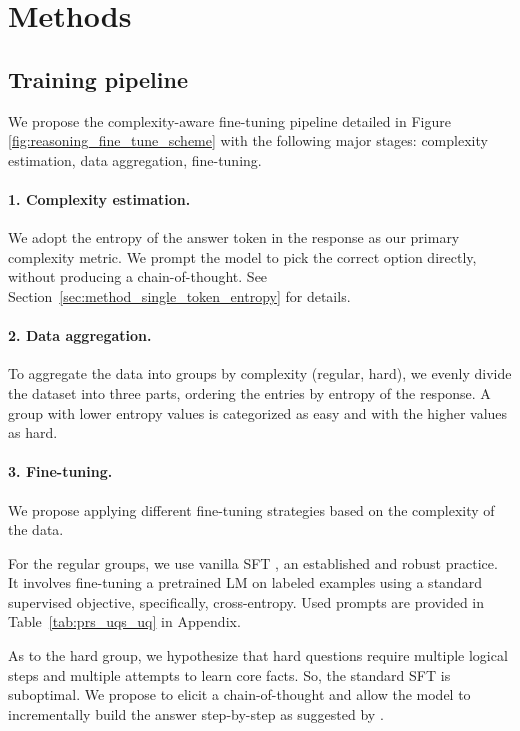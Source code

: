 \section{Methods}

\subsection{Training pipeline}
\label{sec:pipeline}

We propose the complexity-aware fine-tuning pipeline detailed in Figure \ref{fig:reasoning_fine_tune_scheme} with the following major stages: complexity estimation, data aggregation, fine-tuning.

\paragraph{1. Complexity estimation.}
We adopt the entropy of the answer token in the response as our primary complexity metric. We prompt the model to pick the correct option directly, without producing a chain-of-thought. See Section~\ref{sec:method_single_token_entropy} for details.

\paragraph{2. Data aggregation.}
To aggregate the data into groups by complexity (regular, hard), we evenly divide the dataset into three parts, ordering the entries by entropy of the response. A group with lower entropy values is categorized as easy and with the higher values as hard.

\paragraph{3. Fine-tuning.}
We propose applying different fine-tuning strategies based on the complexity of the data.

For the regular groups, we use vanilla SFT \cite{howard2018universallanguagemodelfinetuning, raffel2023exploringlimitstransferlearning}, an established and robust practice. 
It involves fine-tuning a pretrained LM on labeled examples using a standard supervised objective, specifically, cross-entropy.
Used prompts are provided in Table~\ref{tab:prs_uqs_uq} in Appendix. 

As to the hard group, we hypothesize that hard questions require multiple logical steps and multiple attempts to learn core facts.
So, the standard SFT is suboptimal. 
We propose to elicit a chain-of-thought and allow the model to incrementally build the answer step-by-step as suggested by \citet{wei2023chainofthoughtpromptingelicitsreasoning}.

